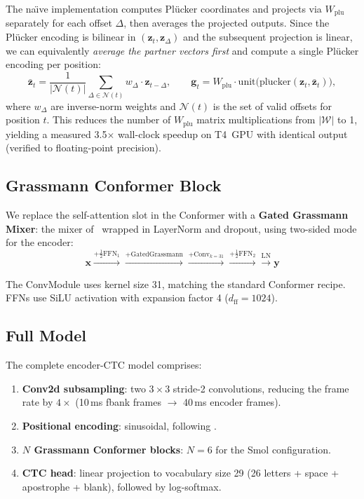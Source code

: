 \documentclass[11pt,a4paper]{article}
\newcommand{\plucker}{Pl\"{u}cker}
\begin{document}
The na\"{\i}ve implementation computes \plucker{} coordinates and
projects via $W_{\mathrm{plu}}$ separately for each offset $\Delta$,
then averages the projected outputs.  Since the \plucker{} encoding is
bilinear in $(\bm{z}_t, \bm{z}_\Delta)$ and the subsequent projection
is linear, we can equivalently \emph{average the partner vectors first}
and compute a single \plucker{} encoding per position:
\begin{equation}
  \bar{\bm{z}}_t = \frac{1}{|\mathcal{N}(t)|} \sum_{\Delta \in
  \mathcal{N}(t)} w_\Delta \cdot \bm{z}_{t-\Delta}, \qquad
  \bm{g}_t = W_{\mathrm{plu}} \cdot \mathrm{unit}\bigl(
  \mathrm{pl\ddot{u}cker}(\bm{z}_t, \bar{\bm{z}}_t)\bigr),
\end{equation}
where $w_\Delta$ are inverse-norm weights and $\mathcal{N}(t)$ is the
set of valid offsets for position $t$.  This reduces the number of
$W_{\mathrm{plu}}$ matrix multiplications from $|\mathcal{W}|$ to 1,
yielding a measured 3.5$\times$ wall-clock speedup on T4~GPU with
identical output (verified to floating-point precision).

\subsection{Grassmann Conformer Block}

We replace the self-attention slot in the Conformer with a
\textbf{Gated Grassmann Mixer}: the mixer of~ wrapped
in LayerNorm and dropout, using two-sided mode for the encoder:
\begin{equation}
  \bm{x} \xrightarrow{+\tfrac{1}{2}\mathrm{FFN}_1}
  \xrightarrow{+\mathrm{GatedGrassmann}}
  \xrightarrow{+\mathrm{Conv}_{k=31}}
  \xrightarrow{+\tfrac{1}{2}\mathrm{FFN}_2}
  \xrightarrow{\mathrm{LN}} \bm{y}
\end{equation}

The ConvModule uses kernel size 31, matching the standard Conformer
recipe.  FFNs use SiLU activation with expansion factor 4 ($d_{\mathrm{ff}} = 1024$).

\subsection{Full Model}

The complete encoder-CTC model comprises:
\begin{enumerate}
  \item \textbf{Conv2d subsampling}: two $3 \times 3$ stride-2
    convolutions, reducing the frame rate by $4\times$ (10\,ms fbank
    frames $\to$ 40\,ms encoder frames).
  \item \textbf{Positional encoding}: sinusoidal, following
    \citet{vaswani2017attention}.
  \item \textbf{$N$ Grassmann Conformer blocks}: $N=6$ for the Smol
    configuration.
  \item \textbf{CTC head}: linear projection to vocabulary size 29
    (26 letters + space + apostrophe + blank), followed by
    log-softmax.
\end{enumerate}
\end{document}
